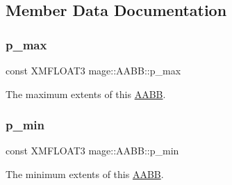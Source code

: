 \subsection{Member Data Documentation}
\hypertarget{structmage_1_1_a_a_b_b_a91ac7c17f1bbd452984a602296f68fba}{}\label{structmage_1_1_a_a_b_b_a91ac7c17f1bbd452984a602296f68fba} 
\subsubsection{\texorpdfstring{p\+\_\+max}{p\_max}}
{\footnotesize\ttfamily const X\+M\+F\+L\+O\+A\+T3 mage\+::\+A\+A\+B\+B\+::p\+\_\+max}

The maximum extents of this \hyperlink{structmage_1_1_a_a_b_b}{A\+A\+BB}. \hypertarget{structmage_1_1_a_a_b_b_aa3794b223acfd4f9dabccde5ae6ce9fb}{}\label{structmage_1_1_a_a_b_b_aa3794b223acfd4f9dabccde5ae6ce9fb} 
\subsubsection{\texorpdfstring{p\+\_\+min}{p\_min}}
{\footnotesize\ttfamily const X\+M\+F\+L\+O\+A\+T3 mage\+::\+A\+A\+B\+B\+::p\+\_\+min}

The minimum extents of this \hyperlink{structmage_1_1_a_a_b_b}{A\+A\+BB}. 